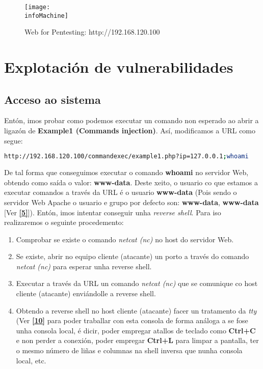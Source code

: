 \documentclass[a4paper]{article}
\newcommand{\infoMachine}{machine_pentesterlab_info.png}
\newcommand{\ipTarget}{192.168.120.100}
\begin{document}
        \begin{figure}[h]
                \centering
                \texttt{[image: \\infoMachine]}
                \caption{Web for Pentesting: http://\ipTarget}
        \end{figure}

\clearpage
        \section{Explotación de vulnerabilidades}
        \vspace{0.2cm}
        \subsection{Acceso ao sistema}
        \vspace{0.2cm}


Entón, imos probar como podemos executar un comando non esperado ao abrir a ligazón de \textbf{Example1 (Commands injection)}. Así, modificamos a URL como segue:\par
        \begin{lstlisting}[language=Bash, caption=Execución do comando whoami empregando un caracter ; logo da URL orixinal, linewidth=18.7cm]
http://192.168.120.100/commandexec/example1.php?ip=127.0.0.1;whoami\end{lstlisting}\par
De tal forma que conseguimos executar o comando \textbf{whoami} no servidor Web, obtendo como saída o valor:  \textbf{\color{red}www-data}. Deste xeito, o usuario co que estamos a executar comandos a través da URL é o usuario \textbf{\color{red}www-data} (Pois sendo o servidor Web Apache o usuario e grupo por defecto son: \textbf{\color{red}www-data}, \textbf{\color{red}www-data} [Ver \href{https://raw.githubusercontent.com/ricardofc/repoEDU-CCbySA/main/SI/Criptografia/Practica-SI-Apache.pdf}{\textbf{\color{blue}[5]}}]).
Entón, imos intentar conseguir unha {\it{reverse shell}}. Para iso realizaremos o seguinte procedemento:
        \begin{enumerate}[label=(\arabic*)]
          \item Comprobar se existe o comando {\it{netcat (nc)}} no host do servidor Web.
          \item Se existe, abrir no equipo cliente (atacante) un porto a través do comando {\it{netcat (nc)}} para esperar unha reverse shell.
          \item Executar a través da URL un comando {\it{netcat (nc)}} que se comunique co host cliente (atacante) enviándolle a reverse shell.
          \item Obtendo a reverse shell no host cliente (atacante) facer un tratamento da {\it{tty}} (Ver \href{https://s4vitar.github.io/oscp-preparacion/\#pentesting-linux}{\textbf{\color{blue}[10]}} para poder traballar con esta consola de forma análoga a se fose unha consola local, é dicir, poder empregar atallos de teclado como \textbf{Ctrl+C} e non perder a conexión, poder empregar \textbf{Ctrl+L} para limpar a pantalla, ter o mesmo número de liñas e columnas na shell inversa que nunha consola local, etc.
        \end{enumerate}
\end{document}
